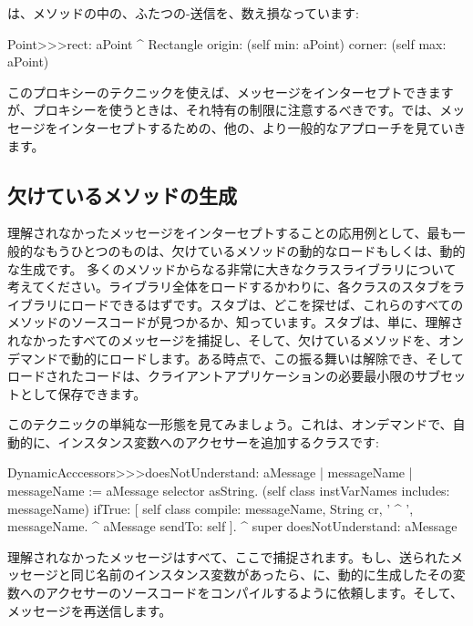 \documentclass[a4paper,10pt,twoside]{book}
\begin{document}
は、メソッドの中の、ふたつの\self-送信を、数え損なっています:
\begin{code}{}
Point>>>rect: aPoint 
	^ Rectangle  origin: (self min: aPoint) corner: (self max: aPoint)
\end{code}

このプロキシーのテクニックを使えば、メッセージをインターセプトできますが、プロキシーを使うときは、それ特有の制限に注意するべきです。では、メッセージをインターセプトするための、他の、より一般的なアプローチを見ていきます。

\subsection{欠けているメソッドの生成}

理解されなかったメッセージをインターセプトすることの応用例として、最も一般的なもうひとつのものは、欠けているメソッドの動的なロードもしくは、動的な生成です。
多くのメソッドからなる非常に大きなクラスライブラリについて考えてください。ライブラリ全体をロードするかわりに、各クラスのスタブをライブラリにロードできるはずです。スタブは、どこを探せば、これらのすべてのメソッドのソースコードが見つかるか、知っています。スタブは、単に、理解されなかったすべてのメッセージを捕捉し、そして、欠けているメソッドを、オンデマンドで動的にロードします。ある時点で、この振る舞いは解除でき、そしてロードされたコードは、クライアントアプリケーションの必要最小限のサブセットとして保存できます。


このテクニックの単純な一形態を見てみましょう。これは、オンデマンドで、自動的に、インスタンス変数へのアクセサーを追加するクラスです:

\begin{code}{}
DynamicAcccessors>>>doesNotUnderstand: aMessage
	| messageName |
	messageName := aMessage selector asString.
	(self class instVarNames includes: messageName)
		ifTrue: [
			self class compile: messageName, String cr, ' ^ ', messageName.
			^ aMessage sendTo: self ].
	^ super doesNotUnderstand: aMessage
\end{code}
理解されなかったメッセージはすべて、ここで捕捉されます。もし、送られたメッセージと同じ名前のインスタンス変数があったら、に、動的に生成したその変数へのアクセサーのソースコードをコンパイルするように依頼します。そして、メッセージを再送信します。
\end{document}
